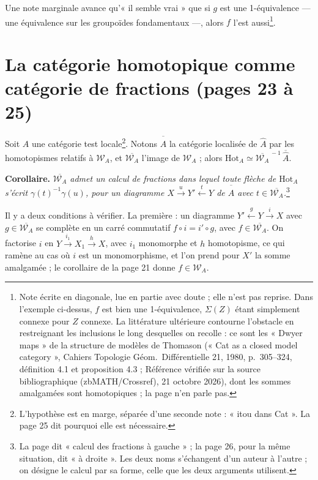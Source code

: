 \documentclass[11pt,a4paper]{article}
\begin{document}
Une note marginale avance qu'« il semble vrai » que si $g$ est une
1-équivalence --- une équivalence sur les groupoïdes fondamentaux ---, alors
$f$ l'est aussi\footnote{Note écrite en diagonale, lue en partie avec doute ;
elle n'est pas reprise. Dans l'exemple ci-dessus, $f$ est bien une
1-équivalence, $\Sigma(Z)$ étant simplement connexe pour $Z$ connexe. La
littérature ultérieure contourne l'obstacle en restreignant les inclusions le
long desquelles on recolle : ce sont les « Dwyer maps » de la structure de modèles de Thomason (« Cat as a closed model category », Cahiers Topologie Géom.\ Différentielle 21, 1980, p.~305--324, définition 4.1 et proposition 4.3 ; Référence vérifiée sur la source bibliographique (zbMATH/Crossref), 21 octobre 2026), dont les sommes amalgamées sont homotopiques ; la
page n'en parle pas.}.

\section*{La catégorie homotopique comme catégorie de fractions (pages 23 à 25)}

Soit $A$ une catégorie test locale\footnote{L'hypothèse est en marge,
séparée d'une seconde note : « itou dans Cat ». La page 25 dit pourquoi elle
est nécessaire.}. Notons $\overline{\widehat{A}}$ la catégorie localisée de
$\widehat{A}$ par les homotopismes relatifs à $\mathcal{W}_{A}$, et
$\overline{\mathcal{W}_{A}}$ l'image de $\mathcal{W}_{A}$ ; alors
$\mathrm{Hot}_{A} \simeq \overline{\mathcal{W}_{A}}^{\,-1}\,
\overline{\widehat{A}}$.

\textbf{Corollaire.} \emph{$\overline{\mathcal{W}_{A}}$ admet un calcul de
fractions dans lequel toute flèche de $\mathrm{Hot}_{A}$ s'écrit
$\gamma(t)^{-1}\gamma(u)$, pour un diagramme $X \xrightarrow{u} Y'
\xleftarrow{t} Y$ de $\overline{\widehat{A}}$ avec $t \in
\overline{\mathcal{W}_{A}}$.}\footnote{La page dit « calcul des fractions à
gauche » ; la page 26, pour la même situation, dit « à droite ». Les deux
noms s'échangent d'un auteur à l'autre ; on désigne le calcul par sa forme,
celle que les deux arguments utilisent.}

Il y a deux conditions à vérifier. La première : un diagramme
$Y' \xleftarrow{g} Y \xrightarrow{i} X$ avec $g \in
\overline{\mathcal{W}_{A}}$ se complète en un carré commutatif
$f \circ i = i' \circ g$, avec $f \in \overline{\mathcal{W}_{A}}$. On factorise
$i$ en $Y \xrightarrow{i_{1}} X_{1} \xrightarrow{h} X$, avec $i_{1}$
monomorphe et $h$ homotopisme, ce qui ramène au cas où $i$ est un
monomorphisme, et l'on prend pour $X'$ la somme amalgamée ; le corollaire de la
page 21 donne $f \in \mathcal{W}_{A}$.
\end{document}
